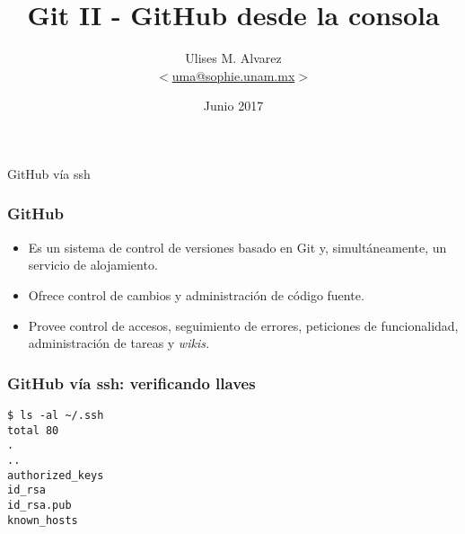 \documentclass{beamer}
\title{Git II - GitHub desde la consola}
\date{Junio 2017}
\author{Ulises M. Alvarez\\ %
   $<$\href{mailto:uma@sophie.unam.mx}%
   {uma@sophie.unam.mx}$>$
}
\institute{Sophie UNAM}
\begin{document}
\maketitle



\begin{frame}[standout]
  GitHub vía ssh
\end{frame}

\begin{frame}
  \frametitle{GitHub}
  \begin{itemize}
  \item Es un sistema de control de versiones basado en Git y,
    simult\'aneamente, un servicio de alojamiento.
  \item Ofrece control de cambios y administraci\'on de c\'odigo
    fuente.
  \item Provee control de accesos, seguimiento de errores, peticiones
    de funcionalidad, administraci\'on de tareas y \textit{wikis.}
  \end{itemize}
\end{frame}

\begin{frame}[fragile]
  \frametitle{GitHub vía ssh: verificando llaves}
\begin{verbatim}
$ ls -al ~/.ssh
total 80
.
..
authorized_keys
id_rsa
id_rsa.pub
known_hosts
\end{verbatim}
\end{frame}



\end{document}
